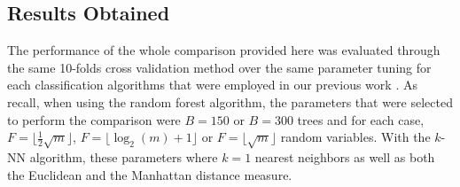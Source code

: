 \documentclass[10pt,conference]{IEEEtran}
\begin{document}
\subsection{Results Obtained}

The performance of the whole comparison provided here was evaluated through the same 10-folds cross validation method over the same parameter tuning for each classification algorithms that were employed in our previous work {\cite{Thullier2017b}}. As recall, when using the random forest algorithm, the parameters that were selected to perform the comparison were $B=150$ or $B=300$ trees and for each case, $F=\lfloor\frac{1}{2}\sqrt{m}\rfloor$, $F=\lfloor\log_2(m)+1\rfloor$ or $F=\lfloor\sqrt{m}\rfloor$ random variables. With the $k$-NN algorithm, these parameters where $k=1$ nearest neighbors as well as both the Euclidean and the Manhattan distance measure.



\end{document}
